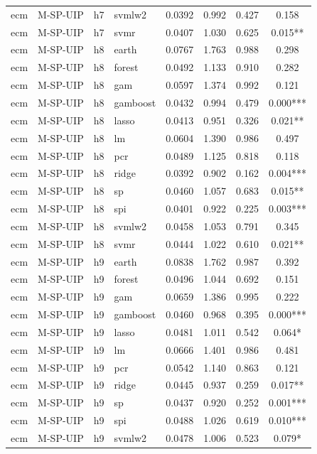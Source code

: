 \begin{ThreePartTable}
\begin{longtable}[t]{llclcccc}
ecm & M-SP-UIP & h7 & svmlw2 & 0.0392 & 0.992 & 0.427 & 0.158\\
ecm & M-SP-UIP & h7 & svmr & 0.0407 & 1.030 & 0.625 & 0.015**\\
\addlinespace
ecm & M-SP-UIP & h8 & earth & 0.0767 & 1.763 & 0.988 & 0.298\\
ecm & M-SP-UIP & h8 & forest & 0.0492 & 1.133 & 0.910 & 0.282\\
ecm & M-SP-UIP & h8 & gam & 0.0597 & 1.374 & 0.992 & 0.121\\
ecm & M-SP-UIP & h8 & gamboost & 0.0432 & 0.994 & 0.479 & 0.000***\\
ecm & M-SP-UIP & h8 & lasso & 0.0413 & 0.951 & 0.326 & 0.021**\\
ecm & M-SP-UIP & h8 & lm & 0.0604 & 1.390 & 0.986 & 0.497\\
ecm & M-SP-UIP & h8 & pcr & 0.0489 & 1.125 & 0.818 & 0.118\\
ecm & M-SP-UIP & h8 & ridge & 0.0392 & 0.902 & 0.162 & 0.004***\\
ecm & M-SP-UIP & h8 & sp & 0.0460 & 1.057 & 0.683 & 0.015**\\
ecm & M-SP-UIP & h8 & spi & 0.0401 & 0.922 & 0.225 & 0.003***\\
ecm & M-SP-UIP & h8 & svmlw2 & 0.0458 & 1.053 & 0.791 & 0.345\\
ecm & M-SP-UIP & h8 & svmr & 0.0444 & 1.022 & 0.610 & 0.021**\\
\addlinespace
ecm & M-SP-UIP & h9 & earth & 0.0838 & 1.762 & 0.987 & 0.392\\
ecm & M-SP-UIP & h9 & forest & 0.0496 & 1.044 & 0.692 & 0.151\\
ecm & M-SP-UIP & h9 & gam & 0.0659 & 1.386 & 0.995 & 0.222\\
ecm & M-SP-UIP & h9 & gamboost & 0.0460 & 0.968 & 0.395 & 0.000***\\
ecm & M-SP-UIP & h9 & lasso & 0.0481 & 1.011 & 0.542 & 0.064*\\
ecm & M-SP-UIP & h9 & lm & 0.0666 & 1.401 & 0.986 & 0.481\\
ecm & M-SP-UIP & h9 & pcr & 0.0542 & 1.140 & 0.863 & 0.121\\
ecm & M-SP-UIP & h9 & ridge & 0.0445 & 0.937 & 0.259 & 0.017**\\
ecm & M-SP-UIP & h9 & sp & 0.0437 & 0.920 & 0.252 & 0.001***\\
ecm & M-SP-UIP & h9 & spi & 0.0488 & 1.026 & 0.619 & 0.010***\\
ecm & M-SP-UIP & h9 & svmlw2 & 0.0478 & 1.006 & 0.523 & 0.079*\\

\end{longtable}
\end{ThreePartTable}
